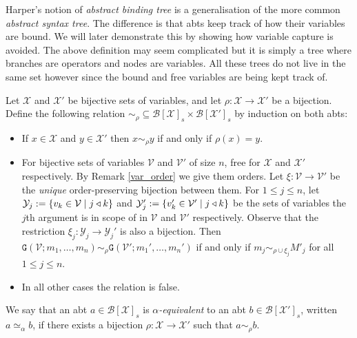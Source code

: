 \begin{remark}
    Harper's notion of \emph{abstract binding tree} is a generalisation of the more common \emph{abstract syntax tree}. The difference is that abts keep track of how their variables are bound. We will later demonstrate this by showing how variable capture is avoided. The above definition may seem complicated but it is simply a tree where branches are operators and nodes are variables. All these trees do not live in the same set however since the bound and free variables are being kept track of.
\end{remark}

\begin{defin}\label{alpha}
    Let $\mathcal{X}$ and $\mathcal{X}'$ be bijective sets of variables, and let $\rho : \mathcal{X} \to \mathcal{X'}$ be a bijection. Define the following relation $\sim_\rho \subseteq \mathcal{B}[\mathcal{X}]_s \times \mathcal{B}[\mathcal{X}']_s$ by induction on both abts:
    \begin{itemize}
        \item If $x \in \mathcal{X}$ and $y \in \mathcal{X}'$ then $x \sim_\rho y $ if and only if $\rho(x) = y$.
        \item For bijective sets of variables $\mathcal{V}$ and $\mathcal{V}'$ of size $n$, free for $\mathcal{X}$ and $\mathcal{X}'$ respectively. By Remark \ref{var_order} we give them orders. Let $\xi : \mathcal{V} \to \mathcal{V}'$ be the \emph{unique} order-preserving bijection between them. For $1 \le j \le n$, let $\mathcal{Y}_j := \{ v_k \in \mathcal{V} \mid j \triangleleft k\}$ and $\mathcal{Y}_j' := \{ v_k' \in \mathcal{V}' \mid j \triangleleft k \}$ be the sets of variables the $j$th argument is in scope of in $\mathcal{V}$ and $\mathcal{V}'$ respectively. Observe that the restriction $\xi_j : \mathcal{Y}_j \to \mathcal{Y}_j'$ is also a bijection. Then $\mathtt{G}(\mathcal{V}; m_1, \dots, m_n) \sim_\rho \mathtt{G}(\mathcal{V}'; m_1', \dots, m_n')$ if and only if $m_j \sim_{\rho \cup \xi_j} M'_j$ for all $1 \le j \le n$.
        \item In all other cases the relation is false.
    \end{itemize}

    We say that an abt $a \in \mathcal{B}[\mathcal{X}]_s$ is \emph{$\alpha$-equivalent} to an abt $b \in \mathcal{B}[\mathcal{X}']_s$, written $a \simeq_{\alpha} b$, if there exists a bijection $\rho : \mathcal{X} \to \mathcal{X'}$ such that $a \sim_\rho b$.
\end{defin}

